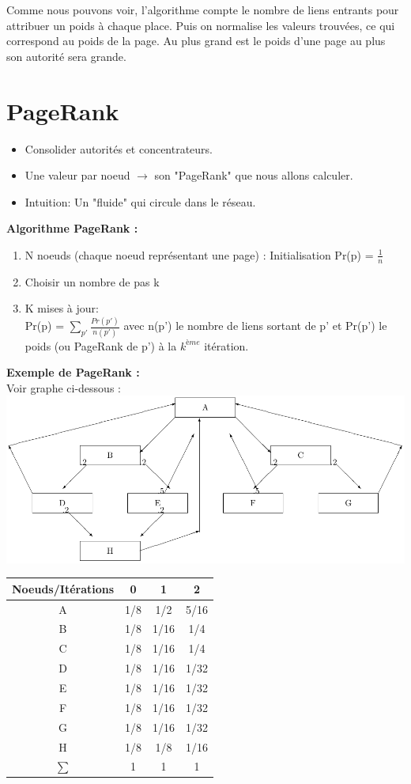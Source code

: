 Comme nous pouvons voir, l'algorithme compte le nombre de liens entrants pour attribuer un poids à chaque place. Puis on normalise les valeurs trouvées, ce qui correspond au poids de la page.
Au plus grand est le poids d'une page au plus son autorité sera grande.\\
\section{PageRank}
\begin{itemize}
\item Consolider autorités et concentrateurs.
\item Une valeur par noeud $ \rightarrow $ son "PageRank" que nous allons calculer. 
\item Intuition: Un "fluide" qui circule dans le réseau. 
\end{itemize}
\textbf{ Algorithme PageRank :}
\begin{enumerate}
\item N noeuds (chaque noeud représentant une page) : Initialisation Pr(p) =  $\frac{1}{n}$
\item Choisir un nombre de pas k
\item K mises à jour:\\
Pr(p) = $ \sum_ {p'}\frac{Pr(p')}{n(p')} $ avec n(p') le nombre de liens sortant de p' et Pr(p') le poids (ou PageRank de p') à la $k^{ème}$ itération.
\end{enumerate}
\textbf{Exemple de PageRank :}\\
Voir graphe ci-dessous : \\ 
 \includegraphics[scale=0.8]{images/24_imagePr.pdf}
 
 	\begin{tabular}{|c| c |c |c |}
		\hline
		Noeuds/Itérations & 0 & 1 & 2 \\
		\hline
		A & 1/8 & 1/2 & 5/16 \\
		B & 1/8 & 1/16 &  1/4   \\
		C & 1/8 & 1/16 & 1/4    \\
		D & 1/8 & 1/16 & 1/32  \\
		E & 1/8 & 1/16 &  1/32   \\
		F & 1/8 & 1/16 & 1/32    \\
		G & 1/8 & 1/16 & 1/32    \\
		H & 1/8 & 1/8 &  1/16   \\
		\hline
		$\sum $ & 1 & 1 & 1 \\
		\hline
	\end{tabular}

